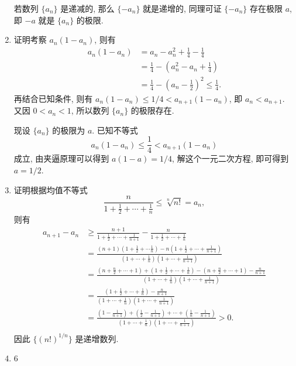 \documentclass[12pt]{article}
\begin{document}
\begin{enumerate}
        若数列 $\{a_n\}$ 是递减的, 那么 $\{-a_n\}$ 就是递增的, 同理可证 $\{-a_n\}$ 存在极限 $a$,
        即 $-a$ 就是 $\{a_n\}$ 的极限.
    \item {\heiti 证明}\quad 考察 $a_n(1 - a_n)$, 则有
        \begin{align*}
            a_n(1 - a_n) &= a_n - a_n^2 + \frac14 - \frac14 \\
                         &= \frac14 - \left(a_n^2 - a_n + \frac14\right) \\
                         &= \frac14 - \left(a_n - \frac12\right)^2 \leqslant \frac14. 
        \end{align*}
        再结合已知条件, 则有 $a_n(1 - a_n) \leqslant 1/4 < a_{n+1}(1 - a_n)$, 即 $a_n < a_{n+1}$.
        又因 $0 < a_n < 1$, 所以数列 $\{a_n\}$ 的极限存在.

        现设 $\{a_n\}$ 的极限为 $a$. 已知不等式
        \[
            a_n(1 - a_n) \leqslant \frac14 < a_{n+1}(1 - a_n)    
        \]
        成立, 由夹逼原理可以得到 $a(1 - a) = 1/4$, 解这个一元二次方程, 即可得到 $a = 1/2$.

    \item {\heiti 证明}\quad 根据均值不等式
        \[
            \frac{n}{1 + \frac12 + \cdots + \frac1n} \leqslant \sqrt[n]{n!} = a_n,    
        \]
        则有
        \begin{align*}
            a_{n+1} - a_n &\geqslant \frac{n+1}{1 + \frac12 + \cdots + \frac{1}{n+1}} - \frac{n}{1 + \frac12 + \cdots + \frac1n} \\
                          &= \frac{(n+1)\left(1 + \frac12 + \cdots \frac1n\right) - n\left(1 + \frac12 + \cdots + \frac{1}{n+1}\right)}{\left(1 + \cdots + \frac1n\right)\left(1 + \cdots + \frac{1}{n+1}\right)} \\
                          &= \frac{\left(n + \frac n2 + \cdots + 1\right) + \left(1 + \frac12 + \cdots + \frac1n\right) - \left(n + \frac n2 + \cdots + 1\right) - \frac{n}{n+1}}{\left(1 + \cdots + \frac1n\right)\left(1 + \cdots + \frac{1}{n+1}\right)} \\
                          &= \frac{\left(1 + \frac12 + \cdots + \frac1n\right) - \frac{n}{n+1}}{\left(1 + \cdots + \frac1n\right)\left(1 + \cdots + \frac{1}{n+1}\right)} \\
                          &= \frac{\left(1 - \frac{1}{n+1}\right) + \left(\frac12 - \frac{1}{n+1}\right) + \cdots + \left(\frac1n - \frac{1}{n+1}\right)}{\left(1 + \cdots + \frac1n\right)\left(1 + \cdots + \frac{1}{n+1}\right)} > 0. \\
        \end{align*}
        因此 $\{(n!)^{1/n}\}$ 是递增数列.
    \item 6
\end{enumerate}
\end{document}
